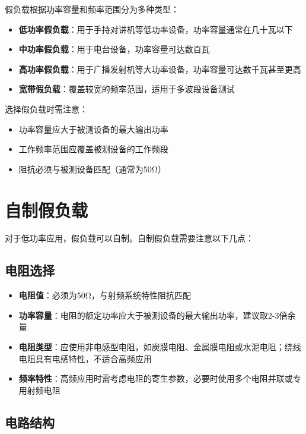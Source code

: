 假负载根据功率容量和频率范围分为多种类型：

\begin{itemize}
    \item \textbf{低功率假负载}：用于手持对讲机等低功率设备，功率容量通常在几十瓦以下
    \item \textbf{中功率假负载}：用于电台设备，功率容量可达数百瓦
    \item \textbf{高功率假负载}：用于广播发射机等大功率设备，功率容量可达数千瓦甚至更高
    \item \textbf{宽带假负载}：覆盖较宽的频率范围，适用于多波段设备测试
\end{itemize}

选择假负载时需注意：
\begin{itemize}
    \item 功率容量应大于被测设备的最大输出功率
    \item 工作频率范围应覆盖被测设备的工作频段
    \item 阻抗必须与被测设备匹配（通常为50Ω）
\end{itemize}

\section{自制假负载}
\label{sec:diy_dummy_load}

对于低功率应用，假负载可以自制。自制假负载需要注意以下几点：

\subsection{电阻选择}

\begin{itemize}
    \item \textbf{电阻值}：必须为50Ω，与射频系统特性阻抗匹配
    \item \textbf{功率容量}：电阻的额定功率应大于被测设备的最大输出功率，建议取2-3倍余量
    \item \textbf{电阻类型}：应使用非电感型电阻，如炭膜电阻、金属膜电阻或水泥电阻；绕线电阻具有电感特性，不适合高频应用
    \item \textbf{频率特性}：高频应用时需考虑电阻的寄生参数，必要时使用多个电阻并联或专用射频电阻
\end{itemize}

\subsection{电路结构}

